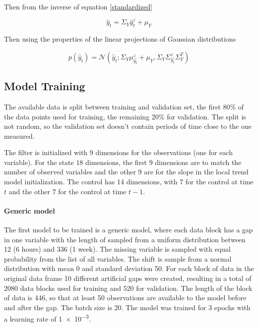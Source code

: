 \documentclass{article}
\newcommand{\norm}[3]{\mathcal{N}\left(#1; #2, #3\right)} %
\let\Oldsubsection\subsection
\renewcommand{\subsection}{\FloatBarrier\Oldsubsection}
\begin{document}
Then from the inverse of equation \ref{standardized}

\begin{equation}
    \hat{y}_t = \Sigma_Y\hat{y}^z_t + \mu_Y
\end{equation}

Then using the properties of the linear projections of Gaussian distributions

\begin{equation}
    p(\hat{y}_t) = \norm{\hat{y}_t}{\Sigma_Y\mu^z_{\hat{y_t}} + \mu_Y}{\Sigma_Y\Sigma^z_{\hat{y_t}}\Sigma_Y^T}
\end{equation}

\subsection{Model Training}

The available data is split between training and validation set, the first 80\% of the data points used for training, the remaining 20\% for validation. The split is not random, so the validation set doesn't contain periods of time close to the one measured.

The filter is initialized with 9 dimensions for the observations (one for each variable). For the state 18 dimensions, the first 9 dimensions are to match the number of observed variables and the other 9 are for the slope in the local trend model initialization. The control has 14 dimensions, with 7 for the control at time $t$ and the other 7 for the control at time $t-1$.

\paragraph{Generic model} The first model to be trained is a generic model, where each data block has a gap in one variable with the length of sampled from a uniform distribution between \num{12} (6 hours) and \num{336} (1 week). The missing variable is sampled with equal probability from the list of all variables. The shift is sample from a normal distribution with mean 0 and standard deviation 50. For each block of data in the original data frame 10 different artificial gaps were created, resulting in a total of 2080 data blocks used for training and 520 for validation. 
The length of the block of data is \num{446}, so that at least \num{50} observations are available to the model before and after the gap. The batch size is \num{20}.
The model was trained for \num{3} epochs with a learning rate of \num{1e-3}.
\end{document}
